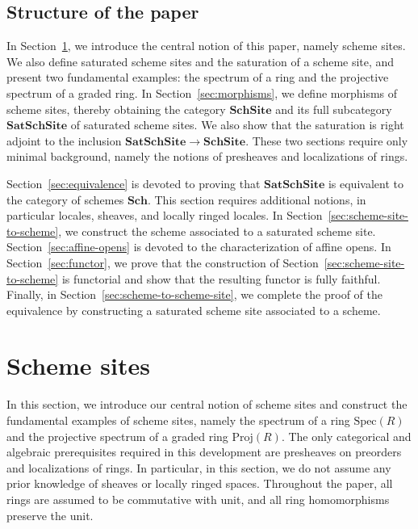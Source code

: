 \documentclass[reqno]{amsart}
\theoremstyle{definition}
\theoremstyle{remark}
\numberwithin{figure}{section}
\begin{document}
\subsection{Structure of the paper}

In Section~\ref{sec:scheme-site}, we introduce the central notion of this paper, namely scheme sites.
We also define saturated scheme sites and the saturation of a scheme site,
and present two fundamental examples: the spectrum of a ring and the projective spectrum of a graded ring.
In Section~\ref{sec:morphisms}, we define morphisms of scheme sites, thereby obtaining the category $\mathbf{SchSite}$ and its full subcategory $\mathbf{SatSchSite}$ of saturated scheme sites.
We also show that the saturation is right adjoint to the inclusion $\mathbf{SatSchSite} \to \mathbf{SchSite}$.
These two sections require only minimal background, namely the notions of presheaves and localizations of rings.

Section~\ref{sec:equivalence} is devoted to proving that $\mathbf{SatSchSite}$ is equivalent to the category of schemes $\mathbf{Sch}$.
This section requires additional notions, in particular locales, sheaves, and locally ringed locales.
In Section~\ref{sec:scheme-site-to-scheme}, we construct the scheme associated to a saturated scheme site.
Section~\ref{sec:affine-opens} is devoted to the characterization of affine opens.
In Section~\ref{sec:functor}, we prove that the construction of Section~\ref{sec:scheme-site-to-scheme} is functorial and show that the resulting functor is fully faithful.
Finally, in Section~\ref{sec:scheme-to-scheme-site}, we complete the proof of the equivalence by constructing a saturated scheme site associated to a scheme.

\section{Scheme sites}
\label{sec:scheme-site}

In this section, we introduce our central notion of scheme sites and construct the fundamental examples of scheme sites,
namely the spectrum of a ring $\mathrm{Spec}(R)$ and the projective spectrum of a graded ring $\mathrm{Proj}(R)$.
The only categorical and algebraic prerequisites required in this development are presheaves on preorders and localizations of rings.
In particular, in this section, we do not assume any prior knowledge of sheaves or locally ringed spaces.
Throughout the paper, all rings are assumed to be commutative with unit, and all ring homomorphisms preserve the unit.
\end{document}
